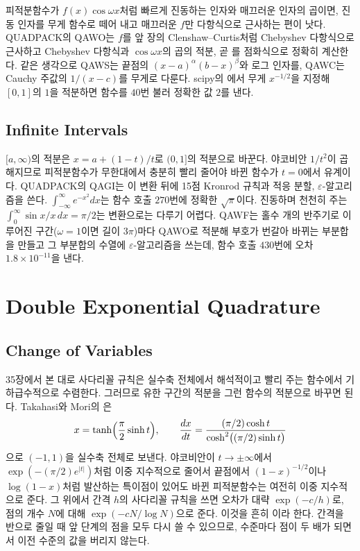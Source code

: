 피적분함수가 $f(x)\cos\omega x$처럼 빠르게 진동하는 인자와 매끄러운 인자의 곱이면, 진동 인자를 무게 함수로 떼어 내고 매끄러운 $f$만 다항식으로 근사하는 편이 낫다. QUADPACK의 QAWO는 $f$를 앞 장의 Clenshaw--Curtis처럼 Chebyshev 다항식으로 근사하고 Chebyshev 다항식과 $\cos\omega x$의 곱의 적분, 곧 를 점화식으로 정확히 계산한다\cite{piessens1983quadpack}. 같은 생각으로 QAWS는 끝점의 $(x-a)^\alpha(b-x)^\beta$와 로그 인자를, QAWC는 Cauchy 주값의 $1/(x-c)$를 무게로 다룬다. scipy의 에서 무게 $x^{-1/2}$을 지정해 $[0,1]$의 $1$을 적분하면 함수를 $40$번 불러 정확한 값 $2$를 낸다.

\subsection{Infinite Intervals}

$[a,\infty)$의 적분은 $x=a+(1-t)/t$로 $(0,1]$의 적분으로 바꾼다. 야코비안 $1/t^2$이 곱해지므로 피적분함수가 무한대에서 충분히 빨리 줄어야 바뀐 함수가 $t=0$에서 유계이다. QUADPACK의 QAGI는 이 변환 뒤에 15점 Kronrod 규칙과 적응 분할, $\varepsilon$-알고리즘을 쓴다. $\int_{-\infty}^\infty e^{-x^2}dx$는 함수 호출 $270$번에 정확한 $\sqrt\pi$이다. 진동하며 천천히 주는 $\int_0^\infty\sin x/x\,dx=\pi/2$는 변환으로는 다루기 어렵다. QAWF는 홀수 개의 반주기로 이루어진 구간($\omega=1$이면 길이 $3\pi$)마다 QAWO로 적분해 부호가 번갈아 바뀌는 부분합을 만들고 그 부분합의 수열에 $\varepsilon$-알고리즘을 쓰는데, 함수 호출 $430$번에 오차 $1.8\times10^{-11}$을 낸다.

\section{Double Exponential Quadrature}
\label{sec:tanh-sinh}

\subsection{Change of Variables}

35장에서 본 대로 사다리꼴 규칙은 실수축 전체에서 해석적이고 빨리 주는 함수에서 기하급수적으로 수렴한다. 그러므로 유한 구간의 적분을 그런 함수의 적분으로 바꾸면 된다. Takahasi와 Mori의 은
\[
x=\tanh\Bigl(\frac\pi2\sinh t\Bigr),\qquad\frac{dx}{dt}=\frac{(\pi/2)\cosh t}{\cosh^2\bigl((\pi/2)\sinh t\bigr)}
\]
으로 $(-1,1)$을 실수축 전체로 보낸다\cite{takahasi1974}. 야코비안이 $t\to\pm\infty$에서 $\exp(-(\pi/2)e^{|t|})$처럼 이중 지수적으로 줄어서 끝점에서 $(1-x)^{-1/2}$이나 $\log(1-x)$처럼 발산하는 특이점이 있어도 바뀐 피적분함수는 여전히 이중 지수적으로 준다. 그 위에서 간격 $h$의 사다리꼴 규칙을 쓰면 오차가 대략 $\exp(-c/h)$로, 점의 개수 $N$에 대해 $\exp(-cN/\log N)$으로 준다\cite{mori2001}. 이것을 흔히 이라 한다. 간격을 반으로 줄일 때 앞 단계의 점을 모두 다시 쓸 수 있으므로, 수준마다 점이 두 배가 되면서 이전 수준의 값을 버리지 않는다.

